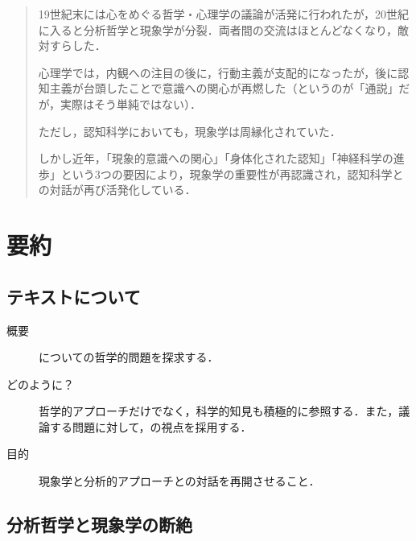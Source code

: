 \documentclass[b5j, 9pt]{ltjsarticle}
\begin{document}

\begin{abstract}
  19世紀末には心をめぐる哲学・心理学の議論が活発に行われたが，20世紀に入ると分析哲学と現象学が分裂．両者間の交流はほとんどなくなり，敵対すらした．\par
  心理学では，内観への注目の後に，行動主義が支配的になったが，後に認知主義が台頭したことで意識への関心が再燃した（というのが「通説」だが，実際はそう単純ではない）．\par
  ただし，認知科学においても，現象学は周縁化されていた．\par
  しかし近年，「現象的意識への関心」「身体化された認知」「神経科学の進歩」という3つの要因により，現象学の重要性が再認識され，認知科学との対話が再び活発化している．
\end{abstract}

\tableofcontents


\section{要約}

\subsection{テキストについて}

\begin{description}
  \item[概要] についての哲学的問題を探求する．
  \item[どのように？] 哲学的アプローチだけでなく，科学的知見も積極的に参照する．また，議論する問題に対して，の視点を採用する．
  \item[目的] 現象学と分析的アプローチとの対話を再開させること．
\end{description}


\subsection{分析哲学と現象学の断絶}
\end{document}
